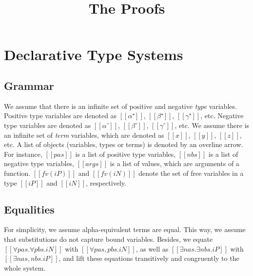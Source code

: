 \documentclass[acmsmall,natbib=false,review,anonymous]{acmart}
\begin{document}
\title{The Proofs}

\maketitle

\tableofcontents

\newpage

\section{Declarative Type Systems}

\subsection{Grammar}
We assume that there is an infinite set of positive and 
negative \emph{type} variables. Positive type variables are denoted as 
$[[α⁺]]$, $[[β⁺]]$, $[[γ⁺]]$, etc.
Negative type variables are denoted as $[[α⁻]]$, $[[β⁻]]$, $[[γ⁻]]$, etc.
We assume there is an infinite set of \emph{term} variables,
which are denoted as $[[x]]$, $[[y]]$, $[[z]]$, etc.
A list of objects (variables, types or terms) is denoted by
an overline arrow. For instance, $[[pas]]$ is a list of positive type variables, 
$[[nbs]]$ is a list of negative type variables, 
$[[args]]$ is a list of values, which are arguments of a function.
$[[fv(iP)]]$ and $[[fv(iN)]]$ denote the set of free variables 
in a type $[[iP]]$ and $[[iN]]$, respectively.

\bigskip


\begin{definition}
  \hfill
  \begin{multicols}{2}
    \ottgrammartabular{
      \ottiN\ottinterrule
    }

    \ottgrammartabular{
      \ottiP\ottinterrule
    }
    \columnbreak
  \end{multicols}
\end{definition}

\subsection{Equalities}
For simplicity, we assume alpha-equivalent terms are equal.
This way, we assume that substitutions do not capture bound variables.
Besides, we equate
$[[∀pas.∀pbs.iN]]$ with $[[∀pas,pbs.iN]]$, 
as well as $[[∃nas.∃nbs.iP]]$ with $[[∃nas,nbs.iP]]$,
and lift these equations transitively and congruently 
to the whole system.
\end{document}
